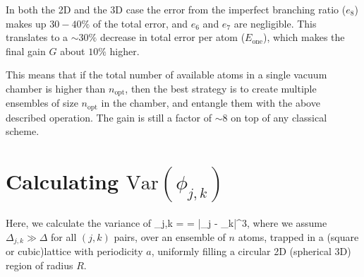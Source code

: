 In both the 2D and the 3D case the error from the imperfect branching ratio
($e_8$) makes up $30-40\%$ of the total error, and $e_6$ and $e_7$ are
negligible. This translates to a $\sim 30\%$ decrease in total error per atom
($E_\mathrm{one}$), which makes the final gain $G$ about $10\%$ higher.

This means that if the total number of available atoms in a single vacuum
chamber is higher than $n_\mathrm{opt}$, then the best strategy is to create
multiple ensembles of size $n_\mathrm{opt}$ in the chamber, and entangle them with
the above described operation.
The gain is still a factor of $\sim 8$ on top of any classical scheme.


\section{Calculating $\mathrm{Var}(\phi_{j,k})$}
\label{sec:calc_varPhi_jk}
Here, we calculate the variance of 
\bel
	\phi_{j,k} =  
	\approx {}
	=  |\br_j - \br_k|^3,
\eel
where we assume $\Delta_{j,k} \gg \Delta$ for all $(j,k)$ pairs, 
over an ensemble of $n$ atoms, trapped in a (square or cubic)lattice with
periodicity $a$, uniformly filling a circular 2D (spherical 3D) region of radius
$R$.



